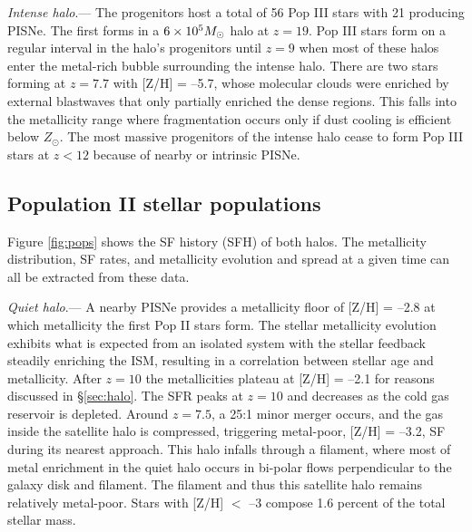 \documentclass[apjl]{emulateapj}
\begin{document}
\textit{Intense halo}.--- The progenitors host a total of 56 Pop III
stars with 21 producing PISNe.  The first forms in a $6 \times 10^5
\Ms$ halo at $z=19$.  Pop III stars form on a regular interval in the
halo's progenitors until $z=9$ when most of these halos enter the
metal-rich bubble surrounding the intense halo.  There are two stars
forming at $z=7.7$ with [Z/H] = --5.7, whose molecular clouds were
enriched by external blastwaves that only partially enriched the dense
regions.  This falls into the metallicity range where fragmentation
occurs only if dust cooling is efficient below  $Z_\odot$.
The most massive progenitors of the intense halo cease to form Pop III
stars at $z<12$ because of nearby or intrinsic PISNe.

\subsection{Population II stellar populations}
\label{sec:pop}

\begin{figure*}
  \caption{\label{fig:pops} The scatter plots show the SF history of
    the quiet (left) and intense (right) halos as a function of
    metallicity at $z=7$.  Each circle represents a star cluster,
    whose area is proportional to its mass.  The open circles in the
    upper right represent sizes of $10^3$, $10^4$, and $10^5$ \Ms~star
    clusters.  The dashed lines in the right panel guide the eye to
    two stellar populations that were formed in two satellite halos,
    merging at $z=7.5$.  The upper histogram collects the SF history
    into 25 equal temporal bins.  The right histogram depicts the
    stellar metallicity distribution.}
\end{figure*}


Figure \ref{fig:pops} shows the SF history (SFH) of both halos.  The
metallicity distribution, SF rates, and metallicity evolution and
spread at a given time can all be extracted from these data.

\textit{Quiet halo}.--- A nearby PISNe provides a metallicity floor of
[Z/H] = --2.8 at which metallicity the first Pop II stars form.  The
stellar metallicity evolution exhibits what is expected from an
isolated system with the stellar feedback steadily enriching the ISM,
resulting in a correlation between stellar age and metallicity.  After
$z=10$ the metallicities plateau at [Z/H] = --2.1 for reasons
discussed in \S\ref{sec:halo}.  The SFR peaks at $z=10$ and decreases
as the cold gas reservoir is depleted.  Around $z=7.5$, a 25:1 minor
merger occurs, and the gas inside the satellite halo is compressed,
triggering metal-poor, [Z/H] = --3.2, SF during its nearest approach.
This halo infalls through a filament, where most of metal enrichment
in the quiet halo occurs in bi-polar flows perpendicular to the galaxy
disk and filament.  The filament and thus this satellite halo remains
relatively metal-poor.  Stars with [Z/H] $<$ --3 compose 1.6 percent
of the total stellar mass.
       
\end{document}

